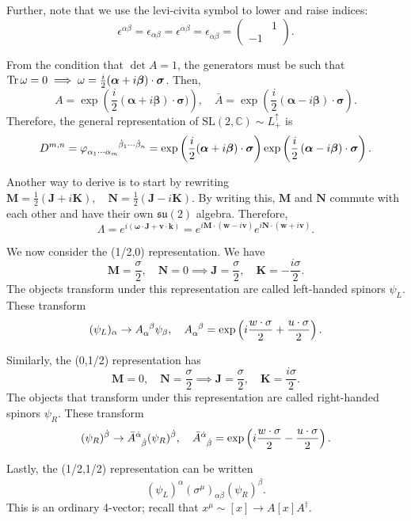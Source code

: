 \documentclass{article}
\begin{document}
Further, note that we use the levi-civita symbol to lower and raise indices:
$$\epsilon^{\alpha\beta}=\epsilon_{\alpha\beta}=\epsilon^{\dot\alpha\dot\beta}=\epsilon_{\dot\alpha\dot\beta}=\begin{pmatrix}&1\\-1&\end{pmatrix}.$$

From the condition that $\det A=1$, the generators must be such that $\Tr \omega=0\implies\omega=\frac i2(\boldsymbol\alpha+i\boldsymbol\beta)\cdot\boldsymbol\sigma$. Then, 
$$A=\exp\left(\frac i2(\boldsymbol\alpha+i\boldsymbol\beta)\cdot\boldsymbol\sigma)\right),\quad\bar A=\exp\left(\frac i2\left(\boldsymbol\alpha-i\boldsymbol\beta\right)\cdot\boldsymbol\sigma\right).$$
Therefore, the general representation of $\mathrm{SL}(2,\mathbb C)\sim L^\uparrow_+$ is 
$$D^{m,n}=\varphi\indices{_{\alpha_1\cdots\alpha_m}^{\dot\beta_1\cdots\dot\beta_n}}=\exp\left(\frac i2(\boldsymbol\alpha+i\boldsymbol\beta)\cdot\boldsymbol\sigma\right)\exp\left(\frac i2\left(\boldsymbol\alpha-i\boldsymbol\beta\right)\cdot\boldsymbol\sigma\right).$$

Another way to derive is to start by rewriting $\mathbf M=\frac 12(\mathbf J+i\mathbf K),\quad\mathbf N=\frac 12(\mathbf J-i\mathbf K)$. By writing this, $\mathbf M$ and $\mathbf N$ commute with each other and have their own $\mathfrak{su}(2)$ algebra. Therefore, 
$$\Lambda=e^{i(\mathbf\omega\cdot\mathbf J+\mathbf v\cdot\mathbf k)}=e^{i\mathbf M\cdot(\mathbf w-i\mathbf v)}e^{i\mathbf N\cdot(\mathbf w+i\mathbf v)}.$$

We now consider the (1/2,0) representation. We have 
$$\mathbf M=\frac{\sigma}2,\quad\mathbf N=0\implies\mathbf J=\frac{\sigma}2,\quad\mathbf K=-\frac{i\sigma}2.$$
The objects transform under this representation are called left-handed spinors $\psi_L$. These transform
$$(\psi_L)_\alpha\to A\indices{_\alpha^\beta}\psi_\beta,\quad A\indices{_\alpha^\beta}=\exp\left(i\frac{w\cdot\sigma}{2}+\frac{u\cdot\sigma}2\right).$$

Similarly, the (0,1/2) representation has
$$\mathbf M=0,\quad \mathbf N=\frac{\sigma}2\implies \mathbf J=\frac{\sigma}2,\quad \mathbf K=\frac{i\sigma}2.$$
The objects that transform under this representation are called right-handed spinors $\psi_R$. These transform
$$(\psi_R)^{\dot\beta}\to\bar A\indices{^{\dot\alpha}_{\dot\beta}}(\psi_R)^{\dot\beta},\quad\bar A\indices{^{\dot\alpha}_{\dot\beta}}=\exp\left(i\frac{w\cdot\sigma}2-\frac{u\cdot\sigma}2\right).$$

Lastly, the (1/2,1/2) representation can be written 
$$(\psi_L)^\alpha(\sigma^\mu)_{\alpha\dot\beta}(\psi_R)^{\dot\beta}.$$
This is an ordinary 4-vector; recall that $x^\mu\sim [x]\to A[x]A^\dag$.
\end{document}
